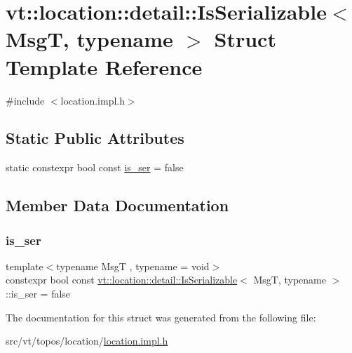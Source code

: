 \hypertarget{structvt_1_1location_1_1detail_1_1_is_serializable}{}\section{vt\+:\+:location\+:\+:detail\+:\+:Is\+Serializable$<$ MsgT, typename $>$ Struct Template Reference}
\label{structvt_1_1location_1_1detail_1_1_is_serializable}


{\ttfamily \#include $<$location.\+impl.\+h$>$}

\subsection*{Static Public Attributes}
\begin{DoxyCompactItemize}
\item 
static constexpr bool const \hyperlink{structvt_1_1location_1_1detail_1_1_is_serializable_a320f8527dc7cca9d32b7fbc3418c2af7}{is\+\_\+ser} = false
\end{DoxyCompactItemize}


\subsection{Member Data Documentation}
\mbox{\label{structvt_1_1location_1_1detail_1_1_is_serializable_a320f8527dc7cca9d32b7fbc3418c2af7}} 
\subsubsection{\texorpdfstring{is\+\_\+ser}{is\_ser}}
{\footnotesize\ttfamily template$<$typename MsgT , typename  = void$>$ \\
constexpr bool const \hyperlink{structvt_1_1location_1_1detail_1_1_is_serializable}{vt\+::location\+::detail\+::\+Is\+Serializable}$<$ MsgT, typename $>$\+::is\+\_\+ser = false\hspace{0.3cm}{\ttfamily [static]}}



The documentation for this struct was generated from the following file\+:\begin{DoxyCompactItemize}
\item 
src/vt/topos/location/\hyperlink{location_8impl_8h}{location.\+impl.\+h}\end{DoxyCompactItemize}

